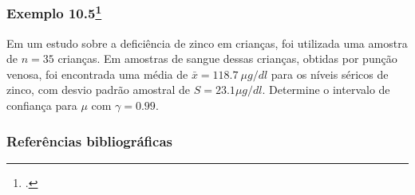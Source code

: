 \documentclass[11pt]{beamer}
\begin{document}
\begin{frame}
\frametitle{Exemplo 10.5\footcite{martinez2015bioestatistica}}
Em um estudo sobre a deficiência de zinco em crianças, foi utilizada uma amostra de \(n=35\) crianças. Em amostras de sangue dessas crianças, obtidas por punção venosa, foi encontrada uma média de \(\bar{x}=118.7\ \mu g/dl\) para os níveis séricos de zinco, com desvio padrão amostral de \(S=23.1 \mu g/dl\). Determine o intervalo de confiança para \(\mu\) com \(\gamma=0.99\).
\vspace{1in}
\vspace{1in}

\end{frame}


\begin{frame}
\frametitle{Referências bibliográficas}
\printbibliography
\end{frame}
\end{document}
